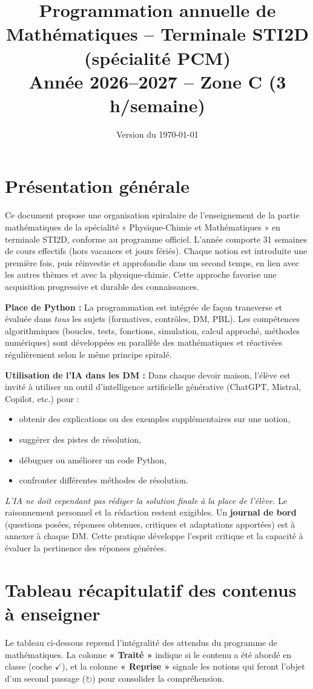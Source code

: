 \documentclass[a4paper,12pt]{article}
\title{Programmation annuelle de Mathématiques -- Terminale STI2D (spécialité PCM) \\
	Année 2026--2027 -- Zone C (3 h/semaine)}
\author{}
\date{Version du \today}
\newcommand{\fait}{\ensuremath{\checkmark}}
\newcommand{\revoit}{\ensuremath{\circlearrowright}}
\begin{document}
	
	\maketitle
	
	\section*{Présentation générale}
	Ce document propose une organisation spiralaire de l’enseignement de la partie mathématiques de la spécialité « Physique-Chimie et Mathématiques » en terminale STI2D, conforme au programme officiel. L’année comporte 31 semaines de cours effectifs (hors vacances et jours fériés). Chaque notion est introduite une première fois, puis réinvestie et approfondie dans un second temps, en lien avec les autres thèmes et avec la physique-chimie. Cette approche favorise une acquisition progressive et durable des connaissances.
	
	\medskip
	\textbf{Place de Python :} La programmation est intégrée de façon transverse et évaluée dans \emph{tous} les sujets (formatives, contrôles, DM, PBL). Les compétences algorithmiques (boucles, tests, fonctions, simulation, calcul approché, méthodes numériques) sont développées en parallèle des mathématiques et réactivées régulièrement selon le même principe spiralé.
	
	\medskip
	\textbf{Utilisation de l’IA dans les DM :} Dans chaque devoir maison, l’élève est invité à utiliser un outil d’intelligence artificielle générative (ChatGPT, Mistral, Copilot, etc.) pour :
	\begin{itemize}
		\item obtenir des explications ou des exemples supplémentaires sur une notion,
		\item suggérer des pistes de résolution,
		\item débuguer ou améliorer un code Python,
		\item confronter différentes méthodes de résolution.
	\end{itemize}
	\emph{L’IA ne doit cependant pas rédiger la solution finale à la place de l’élève.} Le raisonnement personnel et la rédaction restent exigibles. Un \textbf{journal de bord} (questions posées, réponses obtenues, critiques et adaptations apportées) est à annexer à chaque DM. Cette pratique développe l’esprit critique et la capacité à évaluer la pertinence des réponses générées.
	
	\newpage
	
	\section{Tableau récapitulatif des contenus à enseigner}
	Le tableau ci-dessous reprend l’intégralité des attendus du programme de mathématiques. La colonne \textbf{« Traité »} indique si le contenu a été abordé en classe (coche \fait), et la colonne \textbf{« Reprise »} signale les notions qui feront l’objet d’un second passage (\revoit) pour consolider la compréhension.
	
\end{document}
